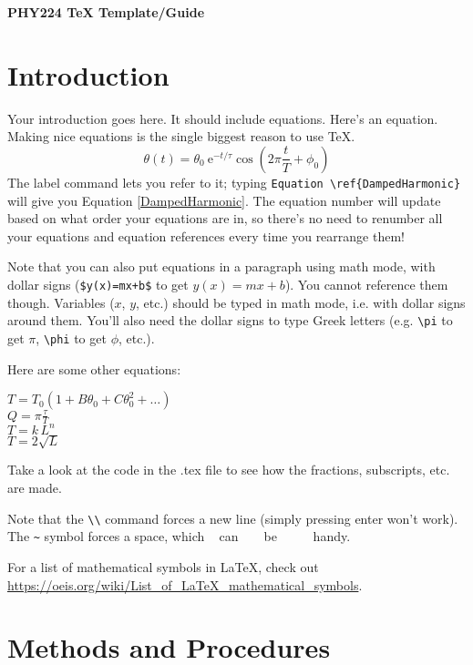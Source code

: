 \documentclass[12pt]{article}
\author{Firstname Lastname} %
\newcommand{\e}{\mathrm{e}}
\begin{document}
\begin{center}
\bf{\LARGE 
PHY224 TeX Template/Guide %
}
\end{center}

\section{Introduction}

Your introduction goes here. It should include equations. Here's an equation. Making nice equations is the single biggest reason to use TeX.
\begin{equation} 
	\label{DampedHarmonic}
	\theta(t) = \theta_0 ~ \e^{-t/\tau} \cos{\left(2\pi \frac{t}{T}+\phi_0 \right)}
\end{equation}
The label command lets you refer to it; typing \verb!Equation \ref{DampedHarmonic}! will give you Equation \ref{DampedHarmonic}. The equation number will update based on what order your equations are in, so there's no need to renumber all your equations and equation references every time you rearrange them!

Note that you can also put equations in a paragraph using math mode, with dollar signs (\verb!$y(x)=mx+b$! to get $y(x)=mx+b$). You cannot reference them though. Variables ($x$, $y$, etc.) should be typed in math mode, i.e. with dollar signs around them. You'll also need the dollar signs to type Greek letters (e.g. \verb!\pi! to get $\pi$, \verb!\phi! to get $\phi$, etc.).

Here are some other equations:

$T = T_0(1  + B \theta_0 + C \theta_0^2 + \ldots )$ \\
$Q = \pi \frac{\tau}{T}$ \\
$T =k\, L^n$ \\
$T = 2 \sqrt{L}$

Take a look at the code in the .tex file to see how the fractions, subscripts, etc. are made.

Note that the \verb!\\! command forces a new line
(simply pressing enter won't work).
The \verb!~! symbol forces a space, which ~ can ~ ~ be ~ ~ ~ handy.

For a list of mathematical symbols in LaTeX, check out \url{https://oeis.org/wiki/List_of_LaTeX_mathematical_symbols}. \\

\section{Methods and Procedures}
\end{document}
